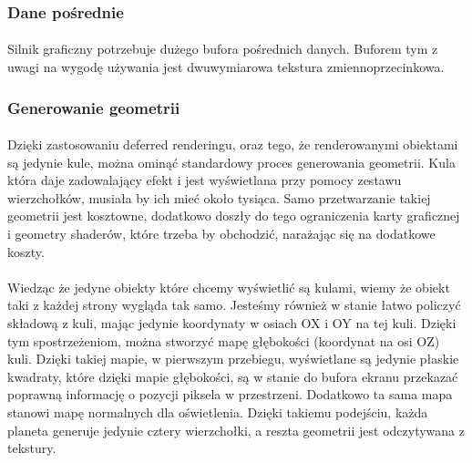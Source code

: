 \subsubsection{Dane pośrednie}\label{ssub:dane pośrednie}
\paragraph{}

Silnik graficzny potrzebuje dużego bufora pośrednich danych. Buforem tym z uwagi na wygodę używania jest dwuwymiarowa tekstura zmiennoprzecinkowa. 

\subsubsection{Generowanie geometrii}\label{ssub:generowanie geometrii}
\paragraph{}

Dzięki zastosowaniu deferred renderingu, oraz tego, że renderowanymi obiektami są jedynie kule, można ominąć standardowy proces generowania geometrii. Kula która daje zadowalający efekt i jest wyświetlana przy pomocy zestawu wierzchołków, musiała by ich mieć około tysiąca. Samo przetwarzanie takiej geometrii jest kosztowne, dodatkowo doszły do tego ograniczenia karty graficznej i geometry shaderów, które trzeba by obchodzić, narażając się na dodatkowe koszty.

\paragraph{}

Wiedząc że jedyne obiekty które chcemy wyświetlić są kulami, wiemy że obiekt taki z każdej strony wygląda tak samo. Jesteśmy również w stanie łatwo policzyć składową z kuli, mając jedynie koordynaty w osiach OX i OY na tej kuli. Dzięki tym spostrzeżeniom, można stworzyć mapę głębokości (koordynat na osi OZ) kuli. Dzięki takiej mapie, w pierwszym przebiegu, wyświetlane są jedynie płaskie kwadraty, które dzięki mapie głębokości, są w stanie do bufora ekranu przekazać poprawną informację o pozycji piksela w przestrzeni. Dodatkowo ta sama mapa stanowi mapę normalnych dla oświetlenia. Dzięki takiemu podejściu, każda planeta generuje jedynie cztery wierzchołki, a reszta geometrii jest odczytywana z tekstury.

\paragraph{}

